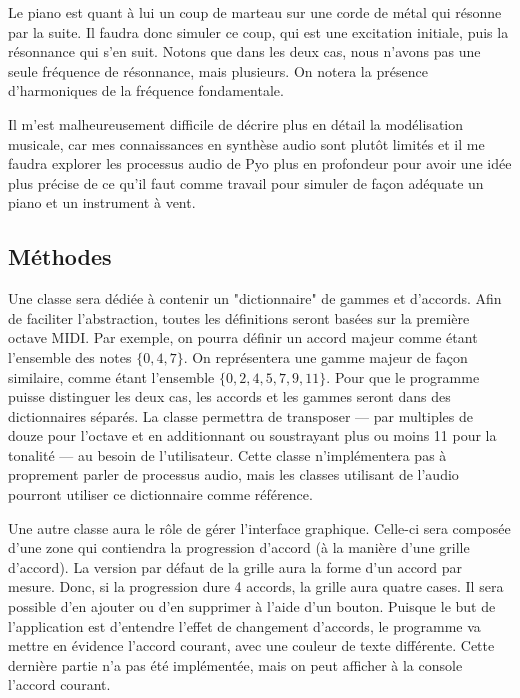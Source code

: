 \documentclass[letterpaper,12pt]{scrartcl}
\begin{document}
	 Le piano est quant à lui un coup de marteau sur une corde de métal qui résonne par la suite. Il faudra donc simuler ce coup, qui est une excitation initiale, puis la résonnance qui s'en suit. Notons que dans les deux cas, nous n'avons pas une seule fréquence de résonnance, mais plusieurs. On notera la présence d'harmoniques de la fréquence fondamentale.
	
	Il m'est malheureusement difficile de décrire plus en détail la modélisation musicale, car mes connaissances en synthèse audio sont plutôt limités et il me faudra explorer les processus audio de Pyo plus en profondeur pour avoir une idée plus précise de ce qu'il faut comme travail pour simuler de façon adéquate un piano et un instrument à vent.

	\subsection{Méthodes}
	Une classe sera dédiée à contenir un "dictionnaire" de gammes et d'accords. Afin de faciliter l'abstraction, toutes les définitions seront basées sur la première octave MIDI. Par exemple, on pourra définir un accord majeur comme étant l'ensemble des notes $\{0,4,7\}$. On représentera une gamme majeur de façon similaire, comme étant l'ensemble $\{0,2,4,5,7,9,11\}$. Pour que le programme puisse distinguer les deux cas, les accords et les gammes seront dans des dictionnaires séparés. La classe permettra de transposer --- par multiples de douze pour l'octave et en additionnant ou soustrayant plus ou moins 11 pour la tonalité --- au besoin de l'utilisateur. Cette classe n'implémentera pas à proprement parler de processus audio, mais les classes utilisant de l'audio pourront utiliser ce dictionnaire comme référence. 
	
	Une autre classe aura le rôle de gérer l'interface graphique. Celle-ci sera composée d'une zone qui contiendra la progression d'accord (à la manière d'une grille d'accord). La version par défaut de la grille aura la forme d'un accord par mesure. Donc, si la progression dure 4 accords, la grille aura quatre cases. Il sera possible d'en ajouter ou d'en supprimer à l'aide d'un bouton. Puisque le but de l'application est d'entendre l'effet de changement d'accords, le programme va mettre en évidence l'accord courant, avec une couleur de texte différente. Cette dernière partie n'a pas été implémentée, mais on peut afficher à la console l'accord courant.
	
\end{document}
